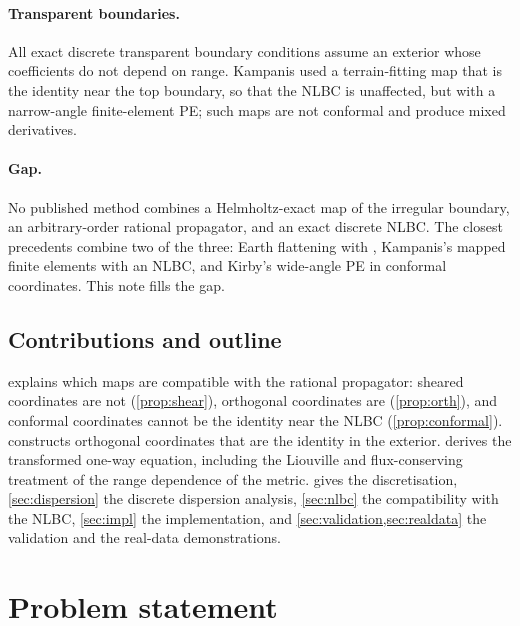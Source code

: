 \documentclass[11pt,a4paper]{article}
\theoremstyle{remark}
\begin{document}
\paragraph{Transparent boundaries.}
All exact discrete transparent boundary conditions
\cite{arnold_ehrhardt1998jcp,ehrhardt_zisowsky2007,lytaev2018awpl,lytaev2022radarconf}
assume an exterior whose coefficients do not depend on range. Kampanis
\cite{kampanis2002,kampanis2005} used a terrain-fitting map that is the identity
near the top boundary, so that the NLBC is unaffected, but with a narrow-angle
finite-element PE; such maps are not conformal and produce mixed derivatives.

\paragraph{Gap.} No published method combines a Helmholtz-exact map of the
irregular boundary, an arbitrary-order rational propagator, and an exact
discrete NLBC. The closest precedents combine two of the three:
Earth flattening with \cite{lytaev2018awpl}, Kampanis's mapped finite elements
with an NLBC, and Kirby's wide-angle PE in conformal coordinates. This note fills
the gap.

\subsection{Contributions and outline}

 explains which maps are compatible with the rational propagator:
sheared coordinates are not (\cref{prop:shear}), orthogonal coordinates are
(\cref{prop:orth}), and conformal coordinates cannot be the identity near the
NLBC (\cref{prop:conformal}).  constructs orthogonal coordinates
that are the identity in the exterior.  derives the
transformed one-way equation, including the Liouville and flux-conserving
treatment of the range dependence of the metric.  gives the
discretisation, \cref{sec:dispersion} the discrete dispersion analysis,
\cref{sec:nlbc} the compatibility with the NLBC, \cref{sec:impl} the
implementation, and
\cref{sec:validation,sec:realdata} the validation and the real-data
demonstrations.

\section{Problem statement}\label{sec:problem}
\end{document}
